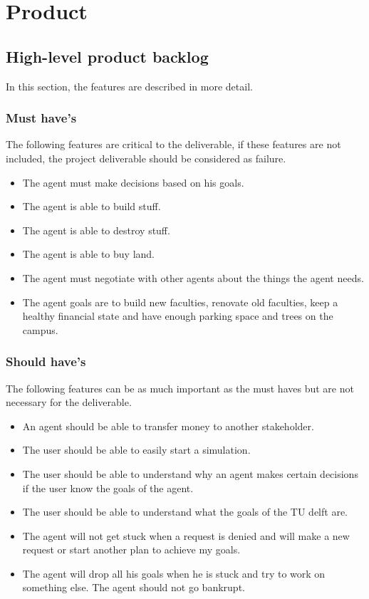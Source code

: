 \section{Product}
\subsection{High-level product backlog}
In this section, the features are described in more detail.

\subsubsection{Must have's}
The following features are critical to the deliverable, if these features are not included, the project deliverable should be considered as failure.
\begin{itemize}
	\item The agent must make decisions based on his goals.
	\item The agent is able to build stuff.
	\item The agent is able to destroy stuff.
	\item The agent is able to buy land.
	\item  The agent must negotiate with other agents about the things the agent needs.
	\item The agent goals are to build new faculties, renovate old faculties, keep a healthy financial state and have enough parking space and trees on the campus.
\end{itemize}

\subsubsection{Should have's}
The following features can be as much important as the must haves but are not necessary for the deliverable.
\begin{itemize}
	\item  An agent should be able to transfer money to another stakeholder.
	\item The user should be able to easily start a simulation.
	\item The user should be able to understand why an agent makes certain decisions if the user know the goals of the agent.
	\item The user should be able to understand what the goals of the TU delft are.
	\item The agent will not get stuck when a request is denied and will make a new request or start another plan to achieve my goals.
	\item The agent will drop all his goals when he is stuck and try to work on something else. The agent should not go bankrupt.
\end{itemize}

